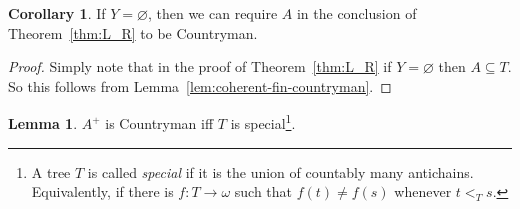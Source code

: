 \documentclass[10pt]{amsart}
\theoremstyle{definition}
\newtheorem{corollary}[theorem]{Corollary}
\newtheorem{lemma}[theorem]{Lemma}
\theoremstyle{remark}
\newcommand{\es}{\varnothing}
\newcommand{\seb}{\subseteq}
\newcommand{\1}{\mathbbm{1}}
\begin{document}
\begin{corollary}\label{cor:countryman_L}
  If $Y = \es$, then we can require $A$ in the conclusion
  of Theorem~\ref{thm:L_R} to be Countryman.
\end{corollary}
\begin{proof}
  Simply note that in the proof of Theorem~\ref{thm:L_R} if $Y = \es$ then $A
  \seb T$. So this follows from Lemma~\ref{lem:coherent-fin-countryman}.
\end{proof}

\begin{lemma}\label{lem:countryman_iff_special}
  $A^{+}$ is Countryman iff $T$ is
  special\footnote{A tree $T$ is called \emph{special} if it is the union
    of countably many antichains. Equivalently, if there
    is $f : T \to \omega$ such that $f(t) \neq f(s)$ whenever $t <_{T} s$.
  }.
\end{lemma}
\end{document}
